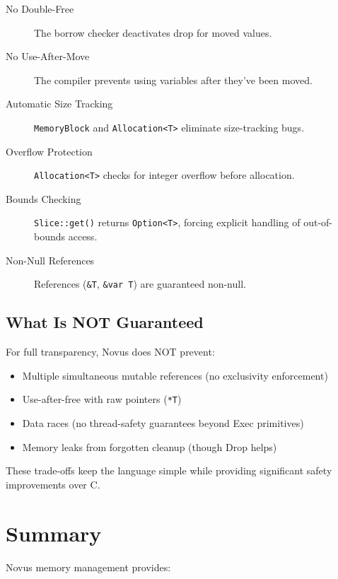 \begin{description}
    \item[No Double-Free] The borrow checker deactivates drop for moved values.

    \item[No Use-After-Move] The compiler prevents using variables after they've been moved.

    \item[Automatic Size Tracking] \texttt{MemoryBlock} and \texttt{Allocation<T>} eliminate size-tracking bugs.

    \item[Overflow Protection] \texttt{Allocation<T>} checks for integer overflow before allocation.

    \item[Bounds Checking] \texttt{Slice::get()} returns \texttt{Option<T>}, forcing explicit handling of out-of-bounds access.

    \item[Non-Null References] References (\texttt{\&T}, \texttt{\&var T}) are guaranteed non-null.
\end{description}

\subsection{What Is NOT Guaranteed}

For full transparency, Novus does NOT prevent:

\begin{itemize}
    \item Multiple simultaneous mutable references (no exclusivity enforcement)
    \item Use-after-free with raw pointers (\texttt{*T})
    \item Data races (no thread-safety guarantees beyond Exec primitives)
    \item Memory leaks from forgotten cleanup (though Drop helps)
\end{itemize}

These trade-offs keep the language simple while providing significant safety improvements over C.

\section{Summary}

Novus memory management provides:

